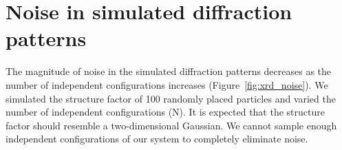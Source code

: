 \documentclass{article}
\begin{document}
 
  \section{Noise in simulated diffraction patterns}\label{section:xrd_noise}
  
  The magnitude of noise in the simulated diffraction patterns decreases as 
  the number of independent configurations increases (Figure~\ref{fig:xrd_noise}).
  We simulated the structure factor of 100 randomly placed particles and varied 
  the number of independent configurations (N). It is expected that the structure
  factor should resemble a two-dimensional Gaussian. We cannot sample enough 
  independent configurations of our system to completely eliminate noise.
  
\end{document}
